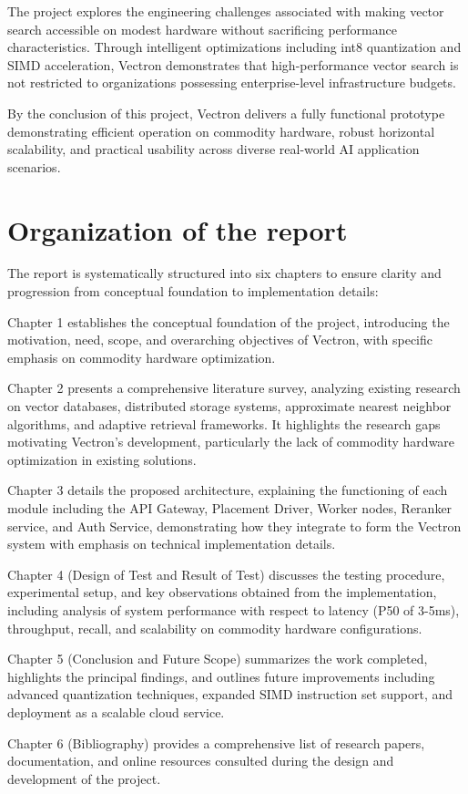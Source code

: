 The project explores the engineering challenges associated with making vector search accessible on modest hardware without sacrificing performance characteristics. Through intelligent optimizations including int8 quantization and SIMD acceleration, Vectron demonstrates that high-performance vector search is not restricted to organizations possessing enterprise-level infrastructure budgets.

By the conclusion of this project, Vectron delivers a fully functional prototype demonstrating efficient operation on commodity hardware, robust horizontal scalability, and practical usability across diverse real-world AI application scenarios.


\section{Organization of the report}

The report is systematically structured into six chapters to ensure clarity and progression from conceptual foundation to implementation details:

\noindent Chapter 1 establishes the conceptual foundation of the project, introducing the motivation, need, scope, and overarching objectives of Vectron, with specific emphasis on commodity hardware optimization.

\noindent Chapter 2 presents a comprehensive literature survey, analyzing existing research on vector databases, distributed storage systems, approximate nearest neighbor algorithms, and adaptive retrieval frameworks. It highlights the research gaps motivating Vectron's development, particularly the lack of commodity hardware optimization in existing solutions.

\noindent Chapter 3 details the proposed architecture, explaining the functioning of each module including the API Gateway, Placement Driver, Worker nodes, Reranker service, and Auth Service, demonstrating how they integrate to form the Vectron system with emphasis on technical implementation details.

\noindent Chapter 4 (Design of Test and Result of Test) discusses the testing procedure, experimental setup, and key observations obtained from the implementation, including analysis of system performance with respect to latency (P50 of 3-5ms), throughput, recall, and scalability on commodity hardware configurations.

\noindent Chapter 5 (Conclusion and Future Scope) summarizes the work completed, highlights the principal findings, and outlines future improvements including advanced quantization techniques, expanded SIMD instruction set support, and deployment as a scalable cloud service.

\noindent Chapter 6 (Bibliography) provides a comprehensive list of research papers, documentation, and online resources consulted during the design and development of the project.